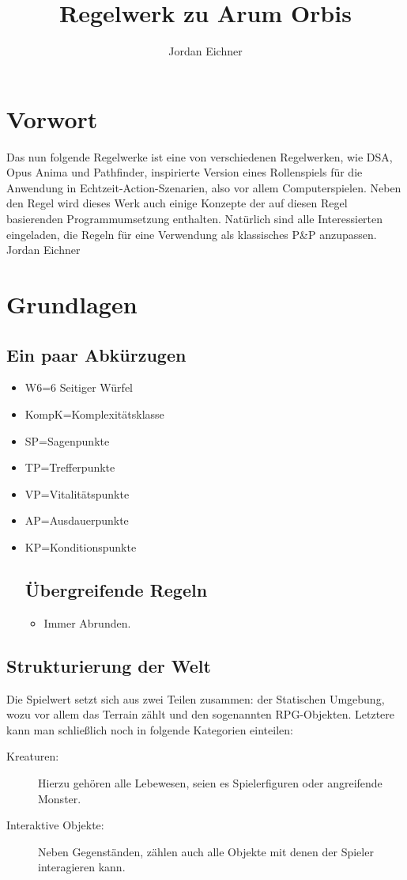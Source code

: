 \documentclass[a4paper,12pt,oneside]{book}
\author{Jordan Eichner}
\title{Regelwerk zu Arum Orbis}
\date{}
\begin{document}
\maketitle
\part*{Vorwort}
Das nun folgende Regelwerke ist eine von verschiedenen Regelwerken, wie DSA, Opus Anima und Pathfinder, inspirierte Version eines Rollenspiels für die Anwendung in Echtzeit-Action-Szenarien, also vor allem Computerspielen. Neben den Regel wird dieses Werk auch einige Konzepte der auf diesen Regel basierenden Programmumsetzung enthalten. Natürlich sind alle Interessierten eingeladen, die Regeln für eine Verwendung als klassisches P\&P anzupassen.
Jordan Eichner

\tableofcontents
  
\part{Grundlagen}
\chapter{Ein paar Abkürzugen}
\begin{itemize}
\item W6=6 Seitiger Würfel
\item KompK=Komplexitätsklasse
\item SP=Sagenpunkte
\item TP=Trefferpunkte
\item VP=Vitalitätspunkte
\item AP=Ausdauerpunkte
\item KP=Konditionspunkte

\chapter{Übergreifende Regeln}
\begin{itemize}
\item Immer Abrunden.
\end{itemize}

\end{itemize}

\chapter{Strukturierung der Welt}
Die Spielwert setzt sich aus zwei Teilen zusammen: der Statischen Umgebung, wozu vor allem das Terrain zählt und den sogenannten RPG-Objekten. Letztere kann man schließlich noch in folgende Kategorien einteilen:
\begin{description}
\item[Kreaturen:]
Hierzu gehören alle Lebewesen, seien es Spielerfiguren oder angreifende Monster.
\item[Interaktive Objekte:]
Neben Gegenständen, zählen auch alle Objekte mit denen der Spieler interagieren kann.
\end{description}
\end{document}
